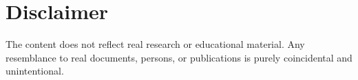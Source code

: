 \section{Disclaimer}
The content does not reflect real research or educational material. Any resemblance to real documents, persons, or publications is purely coincidental and unintentional.

